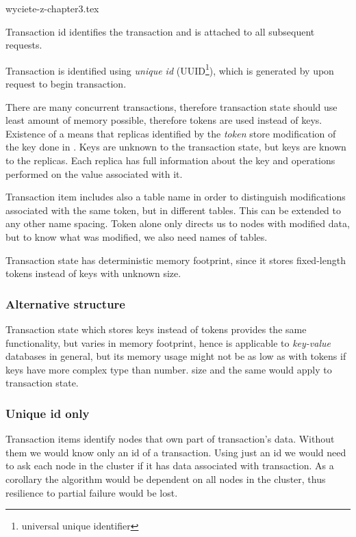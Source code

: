 wyciete-z-chapter3.tex

Transaction id identifies the transaction and is attached to all subsequent requests. 

Transaction \transaction is identified using \emph{unique id} (UUID\footnote{universal unique identifier}), which is generated by  upon request to begin transaction. 

There are many concurrent transactions, therefore transaction state should use least amount of memory possible, therefore tokens are used instead of keys. Existence of a \txItem means that replicas identified by the \emph{token} store modification of the key done in \transaction. Keys are unknown to the transaction state, but keys are known to the replicas. Each replica has full information about the key and operations performed on the value associated with it. 

Transaction item includes also a table name in order to distinguish modifications associated with the same token, but in different tables. This can be extended to any other name spacing.
Token alone only directs us to nodes with modified data, but to know what was modified, we also need names of tables. 

Transaction state has deterministic memory footprint, since it stores fixed-length tokens instead of keys with unknown size. 


\subsubsection{Alternative structure}
Transaction state which stores keys instead of tokens provides the same functionality, but varies in memory footprint,
hence \mpt is applicable to \emph{key-value} databases in general, but its memory usage might not be as low as with tokens if keys have more complex type than number.
size and the same would apply to transaction state.

\subsubsection{Unique id only}
Transaction items identify nodes that own part of transaction's data. Without them we would know only an id of a transaction.
Using just an id we would need to ask each node in the cluster if it has data associated with transaction. As a corollary the algorithm would be dependent on all nodes in the cluster, thus resilience to partial failure would be lost.

